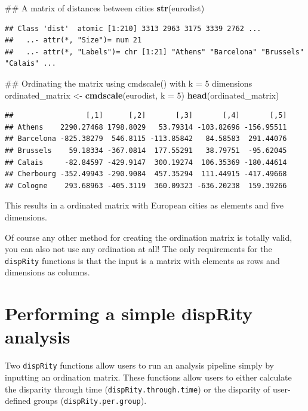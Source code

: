 \documentclass[]{book}
\newenvironment{Shaded}{\begin{snugshade}}{\end{snugshade}}
\newcommand{\KeywordTok}[1]{\textcolor[rgb]{0.13,0.29,0.53}{\textbf{#1}}}
\newcommand{\DataTypeTok}[1]{\textcolor[rgb]{0.13,0.29,0.53}{#1}}
\newcommand{\DecValTok}[1]{\textcolor[rgb]{0.00,0.00,0.81}{#1}}
\newcommand{\StringTok}[1]{\textcolor[rgb]{0.31,0.60,0.02}{#1}}
\newcommand{\NormalTok}[1]{#1}
\theoremstyle{definition}
\theoremstyle{definition}
\theoremstyle{remark}
\begin{document}
\begin{Shaded}
\begin{Highlighting}[]
\NormalTok{## A matrix of distances between cities}
\KeywordTok{str}\NormalTok{(eurodist)}
\end{Highlighting}
\end{Shaded}

\begin{verbatim}
## Class 'dist'  atomic [1:210] 3313 2963 3175 3339 2762 ...
##   ..- attr(*, "Size")= num 21
##   ..- attr(*, "Labels")= chr [1:21] "Athens" "Barcelona" "Brussels" "Calais" ...
\end{verbatim}

\begin{Shaded}
\begin{Highlighting}[]
\NormalTok{## Ordinating the matrix using cmdscale() with k = 5 dimensions }
\NormalTok{ordinated_matrix <-}\StringTok{ }\KeywordTok{cmdscale}\NormalTok{(eurodist, }\DataTypeTok{k =} \DecValTok{5}\NormalTok{)}
\KeywordTok{head}\NormalTok{(ordinated_matrix)}
\end{Highlighting}
\end{Shaded}

\begin{verbatim}
##                 [,1]      [,2]       [,3]       [,4]       [,5]
## Athens    2290.27468 1798.8029   53.79314 -103.82696 -156.95511
## Barcelona -825.38279  546.8115 -113.85842   84.58583  291.44076
## Brussels    59.18334 -367.0814  177.55291   38.79751  -95.62045
## Calais     -82.84597 -429.9147  300.19274  106.35369 -180.44614
## Cherbourg -352.49943 -290.9084  457.35294  111.44915 -417.49668
## Cologne    293.68963 -405.3119  360.09323 -636.20238  159.39266
\end{verbatim}

This results in a ordinated matrix with European cities as elements and
five dimensions.

Of course any other method for creating the ordination matrix is totally
valid, you can also not use any ordination at all! The only requirements
for the \texttt{dispRity} functions is that the input is a matrix with
elements as rows and dimensions as columns.

\section{Performing a simple dispRity
analysis}\label{performing-a-simple-disprity-analysis}

Two \texttt{dispRity} functions allow users to run an analysis pipeline
simply by inputting an ordination matrix. These functions allow users to
either calculate the disparity through time
(\texttt{dispRity.through.time}) or the disparity of user-defined groups
(\texttt{dispRity.per.group}).
\end{document}
